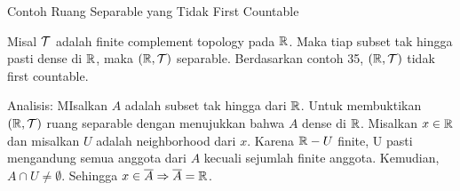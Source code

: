 \begin{frame}{Contoh Ruang Separable yang Tidak First Countable}
\begin{tcolorbox}[enhanced,title=Contoh 46, frame style tile={width=\paperwidth}{\wallpaper}]
Misal $\mathcal{T}$ adalah finite complement topology pada $\mathbb{R}$. Maka tiap subset tak hingga pasti dense di $\mathbb{R}$, maka $(\mathbb{R},\mathcal{T})$ separable. Berdasarkan contoh 35, $(\mathbb{R},\mathcal{T})$ tidak first countable.
\end{tcolorbox}
    Analisis: MIsalkan $A$ adalah subset tak hingga dari $\mathbb{R}$. Untuk membuktikan $(\mathbb{R},\mathcal{T})$ ruang separable dengan menujukkan bahwa $A$ dense di $\mathbb{R}$. Misalkan $x\in \mathbb{R}$ dan misalkan $U$ adalah neighborhood dari $x$. Karena $\mathbb{R}-U$ finite, U pasti mengandung semua anggota dari $A$ kecuali sejumlah finite anggota. Kemudian, $A\cap U \neq \emptyset$. Sehingga $x\in\overline{A}\Rightarrow \overline{A} = \mathbb{R}$.
\end{frame}